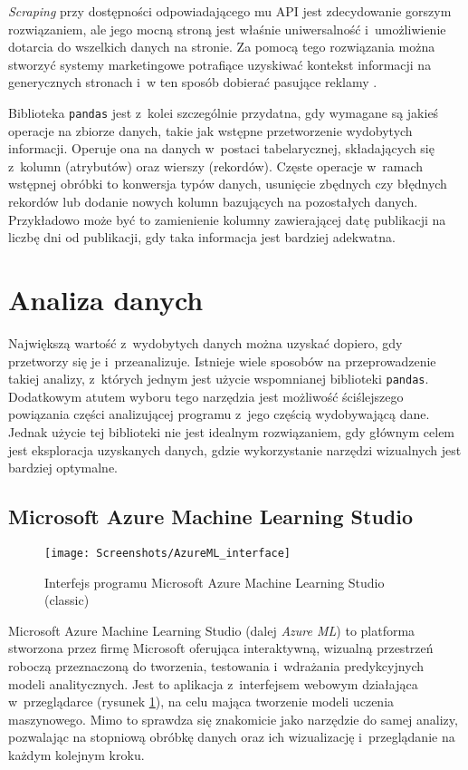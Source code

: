 \emph{Scraping} przy dostępności odpowiadającego mu API jest zdecydowanie gorszym rozwiązaniem, ale jego mocną stroną jest właśnie uniwersalność i~umożliwienie dotarcia do wszelkich danych na stronie.
Za pomocą tego rozwiązania można stworzyć systemy marketingowe potrafiące uzyskiwać kontekst informacji na generycznych stronach i~w ten sposób dobierać pasujące reklamy \cite{vargiu2013exploiting}.

Biblioteka \texttt{pandas} jest z~kolei szczególnie przydatna, gdy wymagane są jakieś operacje na zbiorze danych, takie jak wstępne przetworzenie wydobytych informacji.
Operuje ona na danych w~postaci tabelarycznej, składających się z~kolumn (atrybutów) oraz wierszy (rekordów).
Częste operacje w~ramach wstępnej obróbki to konwersja typów danych, usunięcie zbędnych czy błędnych rekordów lub dodanie nowych kolumn bazujących na pozostałych danych.
Przykładowo może być to zamienienie kolumny zawierającej datę publikacji na liczbę dni od publikacji, gdy taka informacja jest bardziej adekwatna.

\section{Analiza danych}

Największą wartość z~wydobytych danych można uzyskać dopiero, gdy przetworzy się je i~przeanalizuje.
Istnieje wiele sposobów na przeprowadzenie takiej analizy, z~których jednym jest użycie wspomnianej biblioteki \texttt{pandas}.
Dodatkowym atutem wyboru tego narzędzia jest możliwość ściślejszego powiązania części analizującej programu z~jego częścią wydobywającą dane.
Jednak użycie tej biblioteki nie jest idealnym rozwiązaniem, gdy głównym celem jest eksploracja uzyskanych danych, gdzie wykorzystanie narzędzi wizualnych jest bardziej optymalne.

\subsection{Microsoft Azure Machine Learning Studio}

\begin{figure}[ht]
	\texttt{[image: Screenshots/AzureML\_interface]}
	\caption{Interfejs programu Microsoft Azure Machine Learning Studio (classic)}
	\label{fig:interface}
\end{figure}

Microsoft Azure Machine Learning Studio (dalej \emph{Azure ML}) to platforma stworzona przez firmę Microsoft oferująca interaktywną, wizualną przestrzeń roboczą przeznaczoną do tworzenia, testowania i~wdrażania predykcyjnych modeli analitycznych.
Jest to aplikacja z~interfejsem webowym działająca w~przeglądarce (rysunek \ref{fig:interface}), na celu mająca tworzenie modeli uczenia maszynowego.
Mimo to sprawdza się znakomicie jako narzędzie do samej analizy, pozwalając na stopniową obróbkę danych oraz ich wizualizację i~przeglądanie na każdym kolejnym kroku.

